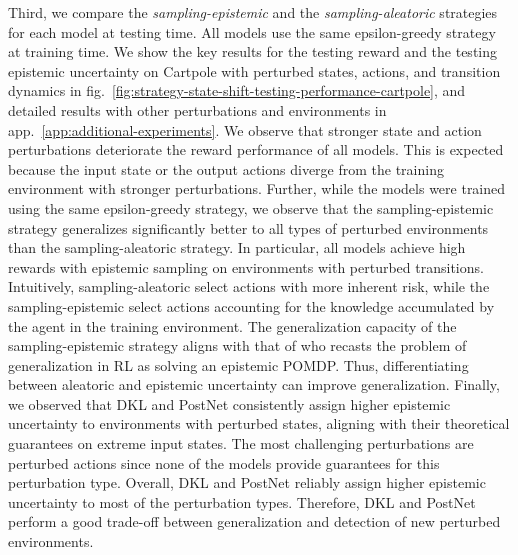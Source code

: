%
%


Third, we compare the \emph{sampling-epistemic} and the \emph{sampling-aleatoric} strategies for each model at testing time. All models use the same epsilon-greedy strategy at training time. We show the key results for the testing reward and the testing epistemic uncertainty on Cartpole with perturbed states, actions, and transition dynamics in fig.~\ref{fig:strategy-state-shift-testing-performance-cartpole}, and detailed results with other perturbations and environments 
in app.~\ref{app:additional-experiments}. We observe that stronger state and action perturbations deteriorate the reward performance of all models. This is expected because the input state or the output actions diverge from the training environment with stronger perturbations. Further, while the models were trained using the same epsilon-greedy strategy, we observe that the sampling-epistemic strategy generalizes significantly better to all types of perturbed environments than the sampling-aleatoric strategy. In particular, all models achieve high rewards with epistemic sampling on environments with perturbed transitions. Intuitively, sampling-aleatoric select actions with more inherent risk, while the sampling-epistemic select actions accounting for the knowledge accumulated by the agent in the training environment. The generalization capacity of the sampling-epistemic strategy aligns with that of \citet{epistemic-pomdp} who recasts the problem of generalization in RL as solving an epistemic POMDP. Thus, differentiating between aleatoric and epistemic uncertainty can improve generalization. Finally, we observed that DKL and PostNet consistently assign higher epistemic uncertainty to environments with perturbed states, aligning with their theoretical guarantees on extreme input states. The most challenging perturbations are perturbed actions since none of the models provide guarantees for this perturbation type. Overall, DKL and PostNet reliably assign higher epistemic uncertainty to most of the perturbation types. Therefore, DKL and PostNet perform a good trade-off between generalization and detection of new perturbed environments.

 
%
%